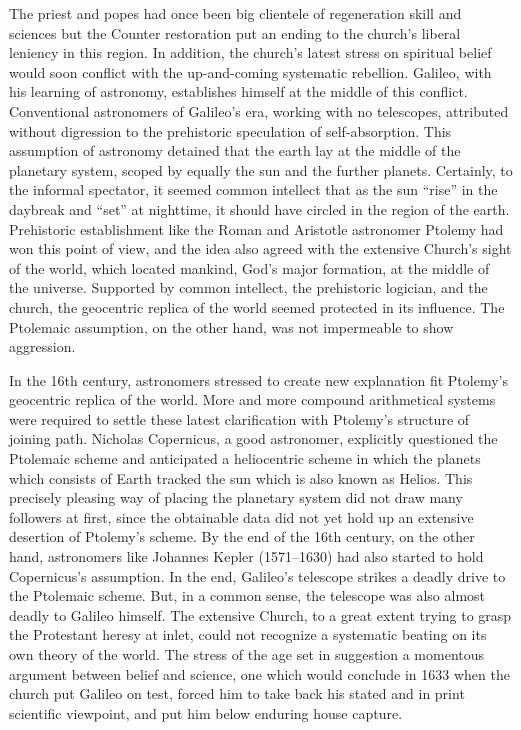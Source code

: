     The priest and popes had once been big clientele of regeneration skill and sciences but the Counter restoration put an ending to the church’s liberal leniency in this region. In addition, the church’s latest stress on spiritual belief would soon conflict with the up-and-coming systematic rebellion. Galileo, with his learning of astronomy, establishes himself at the middle of this conflict. Conventional astronomers of Galileo’s era, working with no telescopes, attributed without digression to the prehistoric speculation of self-absorption. This assumption of astronomy detained that the earth lay at the middle of the planetary system, scoped by equally the sun and the further planets. Certainly, to the informal spectator, it seemed common intellect that as the sun “rise” in the daybreak and “set” at nighttime, it should have circled in the region of the earth. Prehistoric establishment like the Roman and Aristotle astronomer Ptolemy had won this point of view, and the idea also agreed with the extensive Church’s sight of the world, which located mankind, God’s major formation, at the middle of the universe. Supported by common intellect, the prehistoric logician, and the church, the geocentric replica of the world seemed protected in its influence. The Ptolemaic assumption, on the other hand, was not impermeable to show aggression.

    In the 16th century, astronomers stressed to create new explanation fit Ptolemy’s geocentric replica of the world. More and more compound arithmetical systems were required to settle these latest clarification with Ptolemy’s structure of joining path. Nicholas Copernicus, a good astronomer, explicitly questioned the Ptolemaic scheme and anticipated a heliocentric scheme in which the planets which consists of Earth tracked the sun which is also known as Helios. This precisely pleasing way of placing the planetary system did not draw many followers at first, since the obtainable data did not yet hold up an extensive desertion of Ptolemy’s scheme. By the end of the 16th century, on the other hand, astronomers like Johannes Kepler (1571–1630) had also started to hold Copernicus’s assumption. In the end, Galileo’s telescope strikes a deadly drive to the Ptolemaic scheme. But, in a common sense, the telescope was also almost deadly to Galileo himself. The extensive Church, to a great extent trying to grasp the Protestant heresy at inlet, could not recognize a systematic beating on its own theory of the world. The stress of the age set in suggestion a momentous argument between belief and science, one which would conclude in 1633 when the church put Galileo on test, forced him to take back his stated and in print scientific viewpoint, and put him below enduring house capture.

